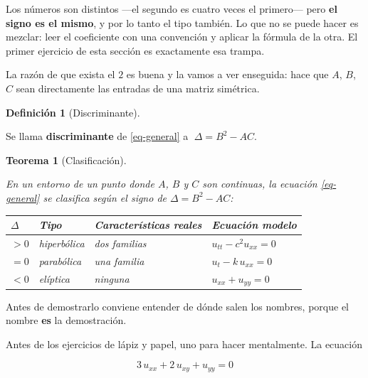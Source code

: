 \documentclass[
  spanish,
  a4paper,
]{scrbook}
\newcounter{none} %
\theoremstyle{definition}
\newtheorem{definition}{Definición}[chapter]
\theoremstyle{plain}
\theoremstyle{definition}
\theoremstyle{plain}
\newtheorem{theorem}{Teorema}[chapter]
\theoremstyle{definition}
\theoremstyle{remark}
\begin{document}
\begin{tcolorbox}[enhanced jigsaw, arc=.35mm, bottomrule=.15mm, breakable, colback=white, colframe=quarto-callout-warning-color-frame, left=2mm, leftrule=.75mm, opacityback=0, rightrule=.15mm, toprule=.15mm]
\begin{minipage}[t]{\textwidth - 5.5mm}
Los números son distintos ---el segundo es cuatro veces el primero---
pero \textbf{el signo es el mismo}, y por lo tanto el tipo también. Lo
que no se puede hacer es mezclar: leer el coeficiente con una convención
y aplicar la fórmula de la otra. El primer ejercicio de esta sección es
exactamente esa trampa.

La razón de que exista el \(2\) es buena y la vamos a ver enseguida:
hace que \(A\), \(B\), \(C\) sean directamente las entradas de una
matriz simétrica.

\end{minipage}%
\end{tcolorbox}

\begin{definition}[Discriminante]\protect\hypertarget{def-discriminante}{}\label{def-discriminante}

Se llama \textbf{discriminante} de \ref{eq-general} a
\(\;\Delta = B^2 - AC\).

\end{definition}

\begin{theorem}[Clasificación]\protect\hypertarget{thm-clasificacion}{}\label{thm-clasificacion}

En un entorno de un punto donde \(A\), \(B\) y \(C\) son continuas, la
ecuación \ref{eq-general} se clasifica según el signo de
\(\Delta = B^2 - AC\):

{\def\LTcaptype{none} %
\begin{longtable}[]{@{}llll@{}}
\toprule\noalign{}
\(\Delta\) & Tipo & Características reales & Ecuación modelo \\
\midrule\noalign{}
\endhead
\bottomrule\noalign{}
\endlastfoot
\(>0\) & hiperbólica & dos familias & \(u_{tt} - c^2 u_{xx} = 0\) \\
\(=0\) & parabólica & una familia & \(u_t - k\,u_{xx} = 0\) \\
\(<0\) & elíptica & ninguna & \(u_{xx} + u_{yy} = 0\) \\
\end{longtable}
}

\end{theorem}

Antes de demostrarlo conviene entender de dónde salen los nombres,
porque el nombre \textbf{es} la demostración.

Antes de los ejercicios de lápiz y papel, uno para hacer mentalmente. La
ecuación

\[3\,u_{xx} + 2\,u_{xy} + u_{yy} = 0\]
\end{document}
